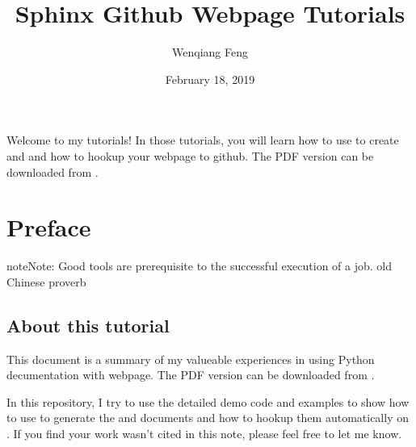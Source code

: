 \documentclass[letterpaper,12pt,english]{sphinxmanual}
\title{Sphinx Github Webpage Tutorials}
\date{February 18, 2019}
\author{Wenqiang Feng}
\begin{document}
\pagestyle{empty}
\sphinxmaketitle
\pagestyle{plain}
\sphinxtableofcontents
\pagestyle{normal}
\label{\detokenize{index::doc}}\begin{quote}

\begin{figure}[htbp]
\centering

\noindent{}
\end{figure}
\end{quote}

Welcome to my  tutorials! In those tutorials, you will learn how to use  to create  and  and how to hookup your  webpage to github. The PDF version can be downloaded from .




\chapter{Preface}
\label{\detokenize{preface:preface}}\label{\detokenize{preface:id1}}\label{\detokenize{preface::doc}}
\begin{sphinxadmonition}{note}{Note:}
Good tools are prerequisite to the successful execution of a job. \textendash{} old Chinese proverb
\end{sphinxadmonition}


\section{About this tutorial}
\label{\detokenize{preface:about-this-tutorial}}
This document is a summary of my valueable experiences in using Python decumentation  with  webpage. The PDF version can be downloaded from . 

In this repository, I try to use the detailed demo code and
examples to show how to use  to generate the  and  documents and how to hookup them automatically on . If you find your work wasn’t cited in this note, please feel free to let me know.
\end{document}
